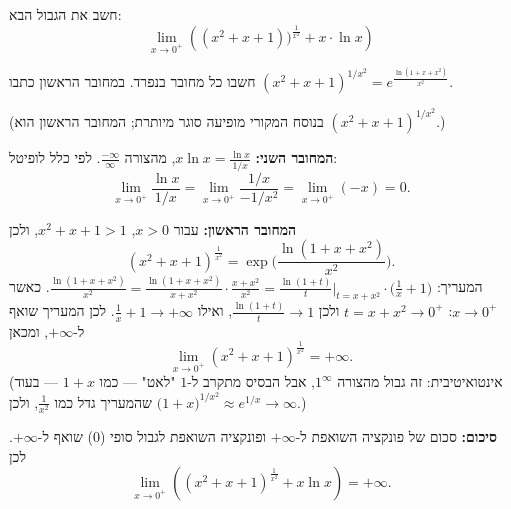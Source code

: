 
\begin{question}
חשב את הגבול הבא:
\[ \lim_{x\to0^+}\left((x^2+x+1))^{\frac{1}{x^2}}+x\cdot\ln x\right) \]
\end{question}

\begin{hint}
חשבו כל מחובר בנפרד. במחובר הראשון כתבו $(x^2+x+1)^{1/x^2}=e^{\frac{\ln(1+x+x^2)}{x^2}}$.
\end{hint}

\begin{solution}
(בנוסח המקורי מופיעה סוגר מיותרת; המחובר הראשון הוא $(x^2+x+1)^{1/x^2}$.)

\textbf{המחובר השני:} $x\ln x=\frac{\ln x}{1/x}$, מהצורה $\frac{-\infty}{\infty}$. לפי כלל לופיטל:
\[ \lim_{x\to0^+}\frac{\ln x}{1/x}=\lim_{x\to0^+}\frac{1/x}{-1/x^2}=\lim_{x\to0^+}(-x)=0 . \]

\textbf{המחובר הראשון:} עבור $x>0$, $x^2+x+1>1$, ולכן
\[ (x^2+x+1)^{\frac{1}{x^2}}=\exp\Big(\frac{\ln(1+x+x^2)}{x^2}\Big). \]
המעריך: $\frac{\ln(1+x+x^2)}{x^2}=\frac{\ln(1+x+x^2)}{x+x^2}\cdot\frac{x+x^2}{x^2}=\frac{\ln(1+t)}{t}\Big|_{t=x+x^2}\cdot\Big(\frac1x+1\Big)$.
כאשר $x\to0^+$: $t=x+x^2\to0^+$ ולכן $\frac{\ln(1+t)}{t}\to1$, ואילו $\frac1x+1\to+\infty$. לכן המעריך שואף ל-$+\infty$, ומכאן
\[ \lim_{x\to0^+}(x^2+x+1)^{\frac{1}{x^2}}=+\infty . \]
(אינטואיטיבית: זה גבול מהצורה $1^\infty$, אבל הבסיס מתקרב ל-$1$ "לאט" --- כמו $1+x$ --- בעוד שהמעריך גדל כמו $\frac{1}{x^2}$, ולכן $\big(1+x\big)^{1/x^2}\approx e^{1/x}\to\infty$.)

\textbf{סיכום:} סכום של פונקציה השואפת ל-$+\infty$ ופונקציה השואפת לגבול סופי ($0$) שואף ל-$+\infty$. לכן
\[ \lim_{x\to0^+}\left((x^2+x+1)^{\frac{1}{x^2}}+x\ln x\right)=\boxed{+\infty} . \]
\end{solution}
